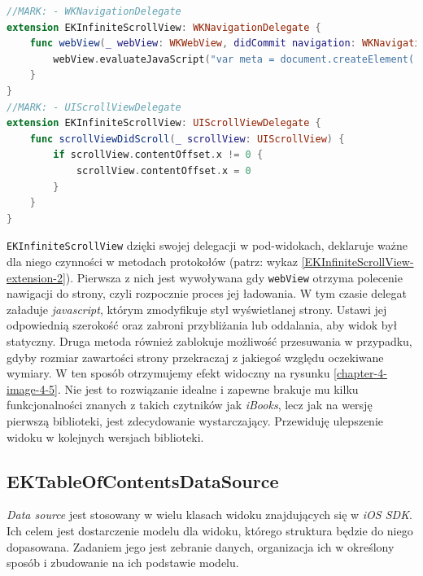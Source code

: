 \begin{lstlisting}[language=swift,caption={Rozszerzenie klasy \texttt{EKInfiniteScrollView} o protokoły \texttt{WKNavigationDelegate} oraz \texttt{UIScrollViewDelegate}}, label=EKInfiniteScrollView-extension-2]
//MARK: - WKNavigationDelegate
extension EKInfiniteScrollView: WKNavigationDelegate {
    func webView(_ webView: WKWebView, didCommit navigation: WKNavigation!) {
        webView.evaluateJavaScript("var meta = document.createElement('meta');meta.setAttribute('name', 'viewport');meta.setAttribute('content', 'width=device-width, initial-scale=1.0, minimum-scale=1.0, maximum-scale=1.0, user-scalable=no');document.getElementsByTagName('head')[0].appendChild(meta);")
    }
}
//MARK: - UIScrollViewDelegate
extension EKInfiniteScrollView: UIScrollViewDelegate {
    func scrollViewDidScroll(_ scrollView: UIScrollView) {
        if scrollView.contentOffset.x != 0 {
            scrollView.contentOffset.x = 0
        }
    }
}
\end{lstlisting}

\texttt{EKInfiniteScrollView} dzięki swojej delegacji w pod-widokach, deklaruje ważne dla niego czynności w metodach protokołów (patrz: wykaz \ref{EKInfiniteScrollView-extension-2}). Pierwsza z nich jest wywoływana gdy \texttt{webView} otrzyma polecenie nawigacji do strony, czyli rozpocznie proces jej ładowania. W tym czasie delegat załaduje \textit{javascript}, którym zmodyfikuje styl wyświetlanej strony. Ustawi jej odpowiednią szerokość oraz zabroni przybliżania lub oddalania, aby widok był statyczny. Druga metoda również zablokuje możliwość przesuwania w przypadku, gdyby rozmiar zawartości strony przekraczaj z jakiegoś względu oczekiwane wymiary. W ten sposób otrzymujemy efekt widoczny na rysunku \ref{chapter-4-image-4-5}. Nie jest to rozwiązanie idealne i zapewne brakuje mu kilku funkcjonalności znanych z takich czytników jak \textit{iBooks}, lecz jak na wersję pierwszą biblioteki, jest zdecydowanie wystarczający. Przewiduję ulepszenie widoku w kolejnych wersjach biblioteki.

\subsection{EKTableOfContentsDataSource}
\label{4-3-4}
\textit{Data source} jest stosowany w wielu klasach widoku znajdujących się w \textit{iOS SDK}. Ich celem jest dostarczenie modelu dla widoku, którego struktura będzie do niego dopasowana. Zadaniem jego jest zebranie danych, organizacja ich w określony sposób i zbudowanie na ich podstawie modelu.

